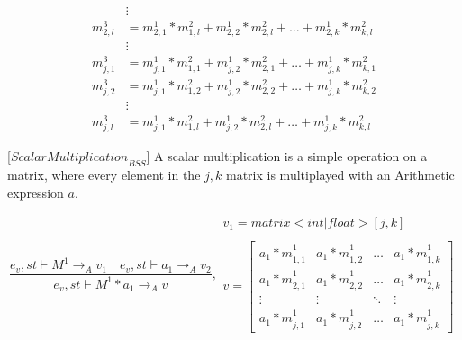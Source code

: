 \begin{minipage}{1.0\textwidth}
\begin{equation*}
\begin{aligned}
&\vdots\\
{ { m }_{ 2,l }^{ 3 } }  &= { { m }_{ 2,1 }^{ 1 } } *{ { m }_{ 1,l }^{ 2 } }+ { { m }_{ 2,2 }^{ 1 } } *{ { m }_{ 2,l }^{ 2 } }+\dots+ { { m }_{ 2,k }^{ 1 } } *{ { m }_{ k,l }^{ 2 } }\\
&\vdots\\
{ { m }_{ j,1 }^{ 3 } }  &= { { m }_{ j,1 }^{ 1 } } *{ { m }_{ 1,1 }^{ 2 } }+ { { m }_{ j,2 }^{ 1 } } *{ { m }_{ 2,1 }^{ 2 } }+\dots+ { { m }_{ j,k }^{ 1 } } *{ { m }_{ k,1 }^{ 2 } }\\
{ { m }_{ j,2 }^{ 3 } }  &= { { m }_{ j,1 }^{ 1 } } *{ { m }_{ 1,2 }^{ 2 } }+ { { m }_{ j,2 }^{ 1 } } *{ { m }_{ 2,2 }^{ 2 } }+\dots+ { { m }_{ j,k }^{ 1 } } *{ { m }_{ k,2 }^{ 2 } }\\
&\vdots\\
{ { m }_{ j,l }^{ 3 } }  &= { { m }_{ j,1 }^{ 1 } } *{ { m }_{ 1,l }^{ 2 } }+ { { m }_{ j,2 }^{ 1 } } *{ { m }_{ 2,l }^{ 2 } }+\dots+ { { m }_{ j,k }^{ 1 } } *{ { m }_{ k,l }^{ 2 } }
\end{aligned}
\label{hypeproduct}
\end{equation*}
\end{minipage}




[${ScalarMultiplication}_{BSS}$]
A scalar multiplication is a simple operation on a matrix, where every element in the $j,k$ matrix is multiplayed with an Arithmetic expression $a$. 

\begin{equation}
	\frac { { e }_{ v },st\vdash { M }^{ 1 }{ \rightarrow  }_{ A }{ v }_{ 1 }\quad { e }_{ v },st\vdash { a }_{ 1 }{ \rightarrow  }_{ A }{ v }_{ 2 } }{ { e }_{ v },st\vdash { M }^{ 1 }\ast { a }_{ 1 }{ \rightarrow  }_{ A }{ v } } ,\begin{matrix} { v }_{ 1 }=matrix<int|float>[j,k] \\  \\ v=\begin{bmatrix} { { a }_{ 1 }*m }_{ 1,1 }^{ 1 } & { { a }_{ 1 }*m }_{ 1,2 }^{ 1 } & \dots  & { { a }_{ 1 }*m }_{ 1,k }^{ 1 } \\ { { a }_{ 1 }*m }_{ 2,1 }^{ 1 } & { { a }_{ 1 }*m }_{ 2,2 }^{ 1 } & \dots  & { { a }_{ 1 }*m }_{ 2,k }^{ 1 } \\ \vdots  & \vdots  & \ddots  & \vdots  \\ { { a }_{ 1 }*m }_{ j,1 }^{ 1 } & { { a }_{ 1 }*m }_{ j,2 }^{ 1 } & \dots  & { { a }_{ 1 }*m }_{ j,k }^{ 1 } \end{bmatrix} \end{matrix}
\end{equation}